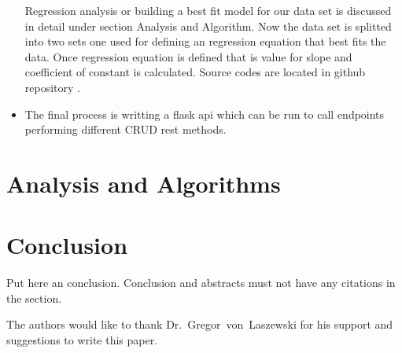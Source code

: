 \begin{itemize}
    Regression analysis or building a best fit model for our data set is
   discussed in detail under section Analysis and Algorithm. Now the data
   set is splitted into two sets one used for defining an regression 
   equation that best fits the data. Once regression equation is defined
   that is value for slope and coefficient of constant is calculated.   
   Source codes are located in github repository \cite{}.
    \item The final process is writting a flask api which can be run to call
 endpoints performing different CRUD rest methods.
\end{itemize}    

\section{Analysis and Algorithms}
  
\section{Conclusion}

Put here an conclusion. Conclusion and abstracts must not have any
citations in the section.


\begin{acks}

  The authors would like to thank Dr.~Gregor~von~Laszewski for his
  support and suggestions to write this paper.

\end{acks}


 
